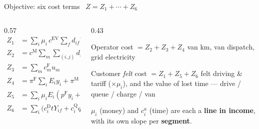 \documentclass[aspectratio=169,11pt]{beamer}
\begin{document}
\begin{frame}{Objective: six cost terms \ $Z=Z_1+\cdots+Z_6$}
  \begin{columns}[T]
    \begin{column}{0.57\textwidth}
      {\footnotesize
      \begin{align*}
        Z_1&=\textstyle\sum_i \mu_i\,c^{\mathrm{EV}}\!\sum_f d_{if}Y_{if}\\
        Z_2&=\textstyle c^{\mathrm M}\!\sum_m\sum_{(i,j)} d_{ij}x_{ijm}\\
        Z_3&=\textstyle\sum_m c^{\mathrm F}_m u_m\\
        Z_4&=\textstyle\pi^{\mathrm F}\!\sum_i E_i y_i+\pi^{\mathrm M}\!\sum_i\tfrac{E_i}{\eta}z_i\\
        Z_5&=\textstyle\sum_i \mu_i E_i(p^{\mathrm F}y_i+p^{\mathrm M}z_i)\\
        Z_6&=\textstyle\sum_i\!\big(c^{\mathrm D}_i t Y_{if}+c^{\mathrm Q}_i q^{\mathrm F}_i+c^{\mathrm C}_i\tau^{\mathrm F}_iy_i+c^{\mathrm V}_i(q^{\mathrm M}_i+\tau^{\mathrm M}_iz_i)\big)
      \end{align*}}
    \end{column}
    \begin{column}{0.43\textwidth}
      {\footnotesize
      \begin{block}{Operator cost $=Z_2+Z_3+Z_4$}
        van km, van dispatch, grid electricity
      \end{block}
      \begin{block}{Customer \emph{felt} cost $=Z_1+Z_5+Z_6$}
        felt driving \& tariff ($\times\mu_i$), and the value of lost time --- drive / queue / charge / van
      \end{block}
      \vspace{1pt}
      $\mu_i$ (money) and $c^a_i$ (time) are each a \textbf{line in income}, with its own slope per \textbf{segment}.}
    \end{column}
  \end{columns}
\end{frame}
\end{document}
